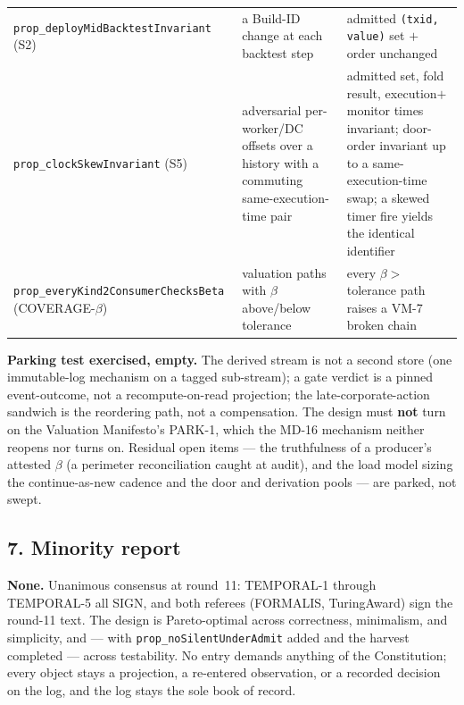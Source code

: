 \documentclass[11pt,a4paper]{article}
\begin{document}
{\begin{longtable}{@{}p{} p{} p{}@{}}
\texttt{prop\_deployMidBacktestInvariant} (S2) & a Build-ID change at each backtest step & admitted
\texttt{(txid, value)} set $+$ order unchanged \\
\texttt{prop\_clockSkewInvariant} (S5) & adversarial per-worker/DC offsets over a history with a commuting
same-execution-time pair & admitted set, fold result, execution$+$monitor times invariant; door-order
invariant up to a same-execution-time swap; a skewed timer fire yields the identical identifier \\
\texttt{prop\_everyKind2ConsumerChecksBeta} (COVERAGE-$\beta$) & valuation paths with $\beta$ above/below
tolerance & every $\beta>$ tolerance path raises a VM-7 broken chain \\
\bottomrule
\end{longtable}}

\noindent\textbf{Parking test exercised, empty.} The derived stream is not a second store (one
immutable-log mechanism on a tagged sub-stream); a gate verdict is a pinned event-outcome, not a
recompute-on-read projection; the late-corporate-action sandwich is the reordering path, not a
compensation. The design must \textbf{not} turn on the Valuation Manifesto's PARK-1, which the MD-16
mechanism neither reopens nor turns on. Residual open items --- the truthfulness of a producer's attested
$\beta$ (a perimeter reconciliation caught at audit), and the load model sizing the continue-as-new
cadence and the door and derivation pools --- are parked, not swept.

\subsection*{7. Minority report}

\textbf{None.} Unanimous consensus at round~11: TEMPORAL-1 through TEMPORAL-5 all SIGN, and both referees
(FORMALIS, TuringAward) sign the round-11 text. The design is Pareto-optimal across correctness,
minimalism, and simplicity, and --- with \texttt{prop\_noSilentUnderAdmit} added and the harvest
completed --- across testability. No entry demands anything of the Constitution; every object stays a
projection, a re-entered observation, or a recorded decision on the log, and the log stays the sole book
of record.
\endgroup
\end{document}
